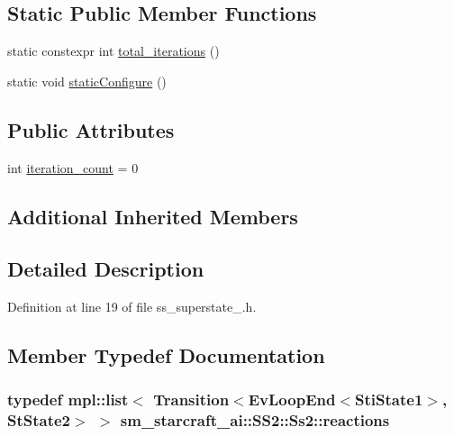 \subsection*{Static Public Member Functions}
\begin{DoxyCompactItemize}
\item 
static constexpr int \hyperlink{structsm__starcraft__ai_1_1SS2_1_1Ss2_a84a59dfd729f657e06866e70185db30d}{total\+\_\+iterations} ()
\item 
static void \hyperlink{structsm__starcraft__ai_1_1SS2_1_1Ss2_ae850134fa74fe23c900558af2223e3db}{static\+Configure} ()
\end{DoxyCompactItemize}
\subsection*{Public Attributes}
\begin{DoxyCompactItemize}
\item 
int \hyperlink{structsm__starcraft__ai_1_1SS2_1_1Ss2_af6260b20ba387ff60a18940102a7e2c2}{iteration\+\_\+count} = 0
\end{DoxyCompactItemize}
\subsection*{Additional Inherited Members}


\subsection{Detailed Description}


Definition at line 19 of file ss\+\_\+superstate\+\_.\+h.



\subsection{Member Typedef Documentation}
\subsubsection[{\texorpdfstring{reactions}{reactions}}]{\setlength{\rightskip}{0pt plus 5cm}typedef mpl\+::list$<$ Transition$<$Ev\+Loop\+End$<${\bf Sti\+State1}$>$, {\bf St\+State2}$>$ $>$ {\bf sm\+\_\+starcraft\+\_\+ai\+::\+S\+S2\+::\+Ss2\+::reactions}}\hypertarget{structsm__starcraft__ai_1_1SS2_1_1Ss2_ac73b072e52e6096da6f2ad200645d6b9}{}\label{structsm__starcraft__ai_1_1SS2_1_1Ss2_ac73b072e52e6096da6f2ad200645d6b9}



